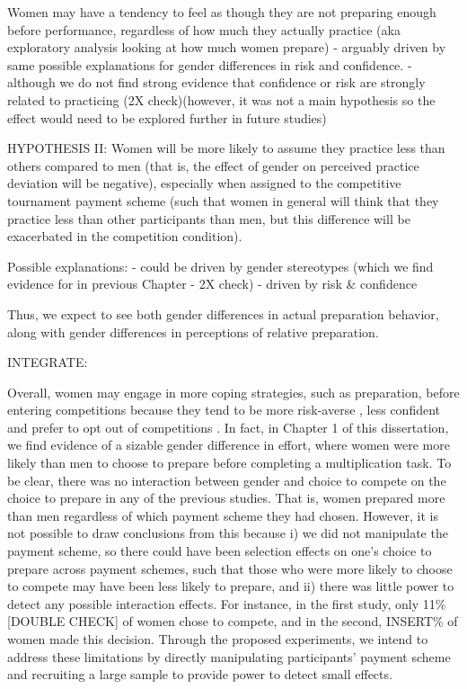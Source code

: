 \documentclass[a4paper, nobind]{templates/ociamthesis}
\begin{document}
Women may have a tendency to feel as though they are not preparing enough before performance, regardless of how much they actually practice (aka exploratory analysis looking at how much women prepare) - arguably driven by same possible explanations for gender differences in risk and confidence. - although we do not find strong evidence that confidence or risk are strongly related to practicing (2X check)(however, it was not a main hypothesis so the effect would need to be explored further in future studies)

HYPOTHESIS II: Women will be more likely to assume they practice less than others compared to men (that is, the effect of gender on perceived practice deviation will be negative), especially when assigned to the competitive tournament payment scheme (such that women in general will think that they practice less than other participants than men, but this difference will be exacerbated in the competition condition).

Possible explanations:
- could be driven by gender stereotypes (which we find evidence for in previous Chapter - 2X check)
- driven by risk \& confidence

Thus, we expect to see both gender differences in actual preparation behavior, along with gender differences in perceptions of relative preparation.

INTEGRATE:

Overall, women may engage in more coping strategies, such as preparation, before entering competitions because they tend to be more risk-averse \autocite{Croson2009,Dohmen2011b,Eckel2008,Bertrand2010a}, less confident \autocite{Bertrand2010,Lundeberg1994,Mobius2011,Barber2001,Croson2009} and prefer to opt out of competitions \autocite{Niederle2011}. In fact, in Chapter 1 of this dissertation, we find evidence of a sizable gender difference in effort, where women were more likely than men to choose to prepare before completing a multiplication task. To be clear, there was no interaction between gender and choice to compete on the choice to prepare in any of the previous studies. That is, women prepared more than men regardless of which payment scheme they had chosen. However, it is not possible to draw conclusions from this because i) we did not manipulate the payment scheme, so there could have been selection effects on one's choice to prepare across payment schemes, such that those who were more likely to choose to compete may have been less likely to prepare, and ii) there was little power to detect any possible interaction effects. For instance, in the first study, only 11\% {[}DOUBLE CHECK{]} of women chose to compete, and in the second, INSERT\% of women made this decision. Through the proposed experiments, we intend to address these limitations by directly manipulating participants' payment scheme and recruiting a large sample to provide power to detect small effects.
\end{document}
